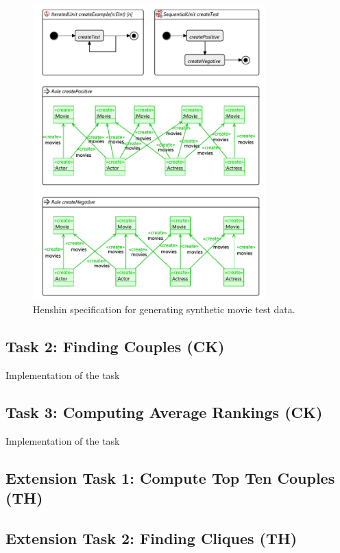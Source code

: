 \documentclass[a4paper]{article}
\begin{document}
\begin{figure}[p]
\centering
\includegraphics[width=0.8\textwidth]{gen-test-data}
\caption{Henshin specification for generating synthetic movie test data.}
\label{fig:gen-test-data}
\end{figure}

\subsection{Task 2: Finding Couples (CK)}

Implementation of the task

\subsection{Task 3: Computing Average Rankings (CK)}


Implementation of the task

\subsection{Extension Task 1: Compute Top Ten Couples (TH)}

\subsection{Extension Task 2: Finding Cliques (TH)}
\end{document}
